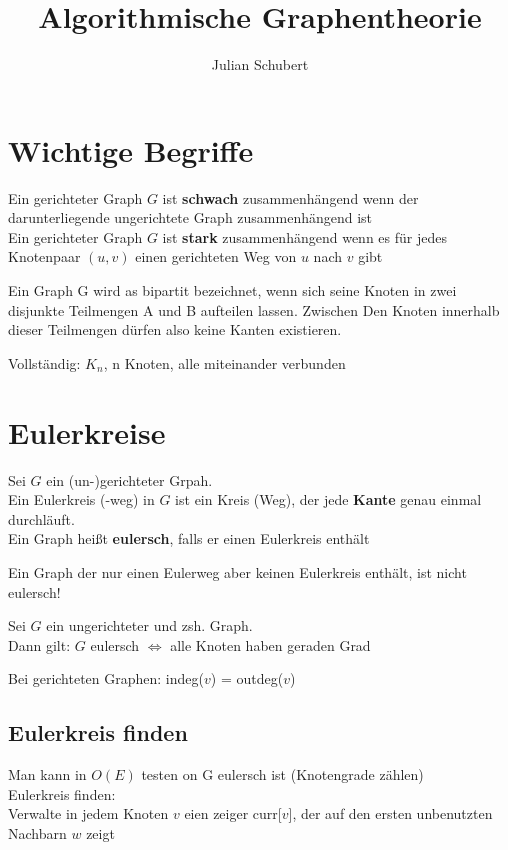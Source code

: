 \documentclass[14pt]{article}
\title{Algorithmische Graphentheorie}
\author{Julian Schubert}
\begin{document}
\maketitle
\tableofcontents

\newpage
\section{Wichtige Begriffe}
\begin{definition}
    Ein gerichteter Graph $G$ ist \textbf{schwach} zusammenhängend
    wenn der darunterliegende ungerichtete Graph zusammenhängend
    ist \\
    Ein gerichteter Graph $G$ ist \textbf{stark} zusammenhängend
    wenn es für jedes Knotenpaar $(u, v)$ einen gerichteten Weg
    von $u$ nach $v$ gibt
\end{definition}
\begin{definition}
    Ein Graph G wird as bipartit bezeichnet, wenn sich seine Knoten
    in zwei disjunkte Teilmengen A und B aufteilen lassen. Zwischen
    Den Knoten innerhalb dieser Teilmengen dürfen also keine Kanten
    existieren.
\end{definition}
\begin{definition}
    Vollständig: $K_n$, n Knoten, alle miteinander verbunden
\end{definition}
\section{Eulerkreise}
\begin{definition}[Eulerkreis]
    Sei $G$ ein (un-)gerichteter Grpah. \\
    Ein Eulerkreis (-weg) in
    $G$ ist ein Kreis (Weg), der jede \textbf{Kante} genau
    einmal durchläuft. \\
    Ein Graph heißt \textbf{eulersch}, falls er einen
    Eulerkreis enthält
\end{definition}
Ein Graph der nur einen Eulerweg aber keinen Eulerkreis
enthält, ist nicht eulersch!
\begin{eigenschaft}
    Sei $G$ ein ungerichteter und zsh. Graph.  \\
    Dann gilt:
    $G$ eulersch $\Leftrightarrow$ alle Knoten haben geraden Grad
\end{eigenschaft}
Bei gerichteten Graphen: indeg($v$) = outdeg($v$)
\subsection{Eulerkreis finden}
Man kann in $O(E)$ testen on G eulersch ist (Knotengrade zählen) \\
Eulerkreis finden: \\
Verwalte in jedem Knoten $v$ eien zeiger curr[$v$], der auf
den ersten unbenutzten Nachbarn $w$ zeigt
\end{document}
